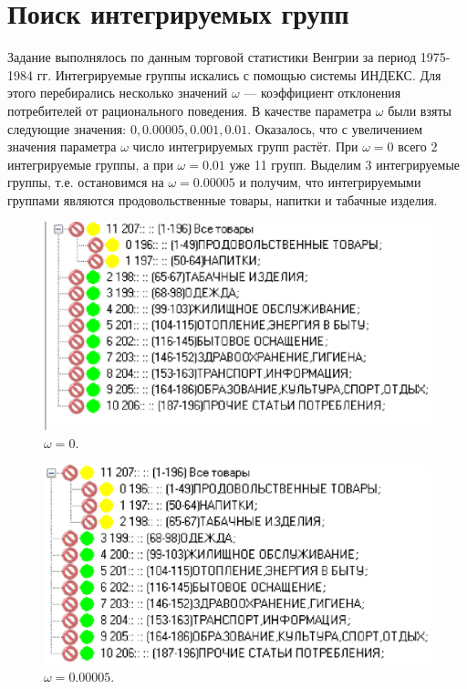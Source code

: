\documentclass[12pt]{article}
\theoremstyle{rusdef}
\begin{document}
\section{Поиск интегрируемых групп}
Задание выполнялось по данным торговой статистики Венгрии за период 1975-1984 гг. Интегрируемые группы искались с помощью системы ИНДЕКС. Для этого перебирались несколько значений $\omega$ --- коэффициент отклонения потребителей от рационального поведения. В качестве параметра $\omega$ были взяты следующие значения: $0, 0.00005, 0.001, 0.01$. Оказалось, что с увеличением значения параметра $\omega$ число интегрируемых групп растёт. При $\omega = 0$ всего 2 интегрируемые группы, а при $\omega = 0.01$ уже 11 групп. Выделим 3 интегрируемые группы, т.е. остановимся на $\omega = 0.00005$ и получим, что интегрируемыми группами являются продовольственные товары, напитки и табачные изделия.
\begin{figure}[h!]
	\centering
	\includegraphics[scale=0.8]{pics/w0.eps}
	\caption{$\omega = 0$.}
\end{figure}
\begin{figure}[h!]
	\centering
	\includegraphics[scale=0.8]{pics/w0.00005.eps}
	\caption{$\omega = 0.00005$.}
\end{figure}
\end{document}
